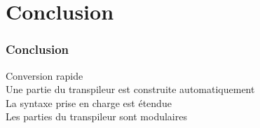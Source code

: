 \section{Conclusion}


\begin{frame}
    \frametitle{Conclusion\esp}

    \point Conversion rapide\\
    \point Une partie du transpileur est construite automatiquement\\
    \point La syntaxe prise en charge est étendue\\
    \point Les parties du transpileur sont modulaires 

\end{frame}